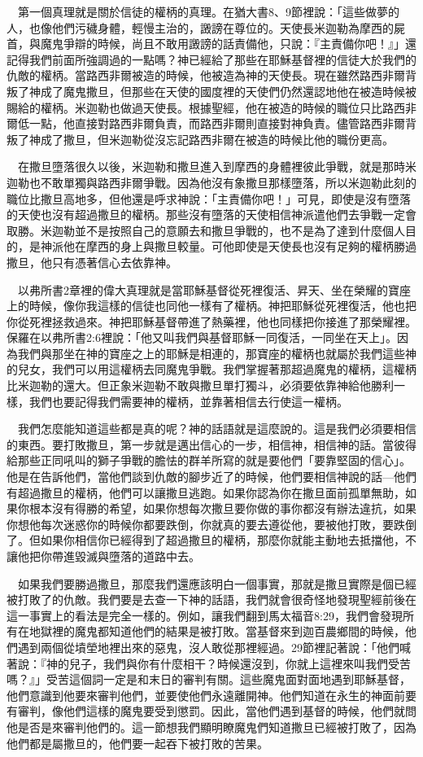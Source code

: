 \documentclass{book}
\begin{document}
　第一個真理就是關於信徒的權柄的真理。在猶大書8、9節裡說：「這些做夢的人，也像他們污穢身體，輕慢主治的，譭謗在尊位的。天使長米迦勒為摩西的屍首，與魔鬼爭辯的時候，尚且不敢用譭謗的話責備他，只說：『主責備你吧！』」還記得我們前面所強調過的一點嗎？神已經給了那些在耶穌基督裡的信徒大於我們的仇敵的權柄。當路西非爾被造的時候，他被造為神的天使長。現在雖然路西非爾背叛了神成了魔鬼撒旦，但那些在天使的國度裡的天使們仍然還認地他在被造時候被賜給的權柄。米迦勒也做過天使長。根據聖經，他在被造的時候的職位只比路西非爾低一點，他直接對路西非爾負責，而路西非爾則直接對神負責。儘管路西非爾背叛了神成了撒旦，但米迦勒從沒忘記路西非爾在被造的時候比他的職份更高。

　在撒旦墮落很久以後，米迦勒和撒旦進入到摩西的身體裡彼此爭戰，就是那時米迦勒也不敢單獨與路西非爾爭戰。因為他沒有象撒旦那樣墮落，所以米迦勒此刻的職位比撒旦高地多，但他還是呼求神說：「主責備你吧！」可見，即使是沒有墮落的天使也沒有超過撒旦的權柄。那些沒有墮落的天使相信神派遣他們去爭戰一定會取勝。米迦勒並不是按照自己的意願去和撒旦爭戰的，也不是為了達到什麼個人目的，是神派他在摩西的身上與撒旦較量。可他即使是天使長也沒有足夠的權柄勝過撒旦，他只有憑著信心去依靠神。

　以弗所書2章裡的偉大真理就是當耶穌基督從死裡復活、昇天、坐在榮耀的寶座上的時候，像你我這樣的信徒也同他一樣有了權柄。神把耶穌從死裡復活，他也把你從死裡拯救過來。神把耶穌基督帶進了熱藥裡，他也同樣把你接進了那榮耀裡。保羅在以弗所書2:6裡說：「他又叫我們與基督耶穌一同復活，一同坐在天上」。因為我們與那坐在神的寶座之上的耶穌是相連的，那寶座的權柄也就屬於我們這些神的兒女，我們可以用這權柄去同魔鬼爭戰。我們掌握著那超過魔鬼的權柄，這權柄比米迦勒的還大。但正象米迦勒不敢與撒旦單打獨斗，必須要依靠神給他勝利一樣，我們也要記得我們需要神的權柄，並靠著相信去行使這一權柄。

　我們怎麼能知道這些都是真的呢？神的話語就是這麼說的。這是我們必須要相信的東西。要打敗撒旦，第一步就是邁出信心的一步，相信神，相信神的話。當彼得給那些正同吼叫的獅子爭戰的膽怯的群羊所寫的就是要他們「要靠堅固的信心」。他是在告訴他們，當他們談到仇敵的腳步近了的時候，他們要相信神說的話---他們有超過撒旦的權柄，他們可以讓撒旦逃跑。如果你認為你在撒旦面前孤單無助，如果你根本沒有得勝的希望，如果你想每次撒旦要你做的事你都沒有辦法違抗，如果你想他每次迷惑你的時候你都要跌倒，你就真的要去遵從他，要被他打敗，要跌倒了。但如果你相信你已經得到了超過撒旦的權柄，那麼你就能主動地去抵擋他，不讓他把你帶進毀滅與墮落的道路中去。

　如果我們要勝過撒旦，那麼我們還應該明白一個事實，那就是撒旦實際是個已經被打敗了的仇敵。我們要是去查一下神的話語，我們就會很奇怪地發現聖經前後在這一事實上的看法是完全一樣的。例如，讓我們翻到馬太福音8:29，我們會發現所有在地獄裡的魔鬼都知道他們的結果是被打敗。當基督來到迦百農鄉間的時候，他們遇到兩個從墳塋地裡出來的惡鬼，沒人敢從那裡經過。29節裡記著說：「他們喊著說：『神的兒子，我們與你有什麼相干？時候還沒到，你就上這裡來叫我們受苦嗎？』」受苦這個詞一定是和末日的審判有關。這些魔鬼面對面地遇到耶穌基督，他們意識到他要來審判他們，並要使他們永遠離開神。他們知道在永生的神面前要有審判，像他們這樣的魔鬼要受到懲罰。因此，當他們遇到基督的時候，他們就問他是否是來審判他們的。這一節想我們顯明瞭魔鬼們知道撒旦已經被打敗了，因為他們都是屬撒旦的，他們要一起吞下被打敗的苦果。
\end{document}
